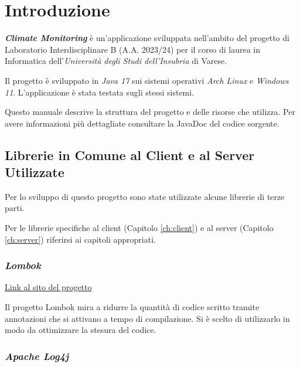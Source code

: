 \maketitle

\cleardoublepage
{}
{}
\tableofcontents

\listoffigures

\chapter{Introduzione}
\textsl{\textbf{Climate Monitoring}} è un'applicazione sviluppata nell’ambito del progetto di Laboratorio Interdisciplinare B (A.A. 2023/24) per il corso di laurea in Informatica dell’\textsl{Universit\`a degli Studi dell’Insubria} di Varese.

Il progetto è sviluppato in \textsl{Java 17} sui sistemi operativi \textsl{Arch Linux} e \textsl{Windows 11}.
L'applicazione è stata testata sugli stessi sistemi.

Questo manuale descrive la struttura del progetto e delle risorse che utilizza. Per avere informazioni più dettagliate consultare la JavaDoc del codice sorgente.

\section{Librerie in Comune al Client e al Server Utilizzate}

Per lo sviluppo di questo progetto sono state utilizzate alcune librerie di terze parti.

Per le librerie specifiche al client (Capitolo \ref{ch:client}) e al server (Capitolo \ref{ch:server}) riferirsi ai capitoli appropriati.

\subsection{\textsl{Lombok}}

\href{https://projectlombok.org/}{Link al sito del progetto}

Il progetto Lombok mira a ridurre la quantità di codice scritto tramite annotazioni che si attivano a tempo di compilazione. Si è scelto di utilizzarlo in modo da ottimizzare la stesura del codice.

\subsection{\textsl{Apache Log4j}}

